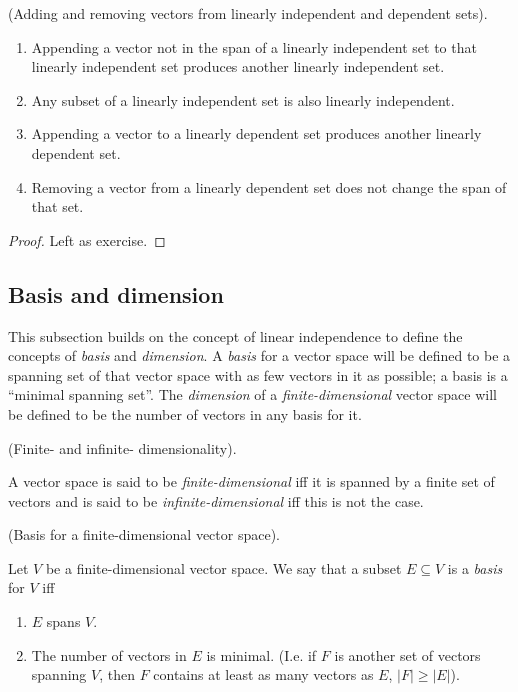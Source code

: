 \begin{lemma}
    \label{ch::lin_alg::lemma::adding_removing_vectors_li_ld_sets}
    (Adding and removing vectors from linearly independent and dependent sets).

    \begin{enumerate}
        \item Appending a vector not in the span of a linearly independent set to that linearly independent set produces another linearly independent set.
        \item Any subset of a linearly independent set is also linearly independent.
        \item Appending a vector to a linearly dependent set produces another linearly dependent set.
        \item Removing a vector from a linearly dependent set does not change the span of that set.
    \end{enumerate}
\end{lemma}

\begin{proof}
   Left as exercise.
\end{proof}


\newpage

\subsection*{Basis and dimension}

This subsection builds on the concept of linear independence to define the concepts of \textit{basis} and \textit{dimension}. A \textit{basis} for a vector space will be defined to be a spanning set of that vector space with as few vectors in it as possible; a basis is a ``minimal spanning set''. The \textit{dimension} of a \textit{finite-dimensional} vector space will be defined to be the number of vectors in any basis for it.

\begin{defn}
    (Finite- and infinite- dimensionality).
    
    A vector space is said to be \textit{finite-dimensional} iff it is spanned by a finite set of vectors and is said to be \textit{infinite-dimensional} iff this is not the case.
\end{defn}

\begin{defn}
    (Basis for a finite-dimensional vector space). 
    
    Let $V$ be a finite-dimensional vector space. We say that a subset $E \subseteq V$ is a \textit{basis} for $V$ iff
    
    \begin{enumerate}
        \item $E$ spans $V$.
        \item The number of vectors in $E$ is minimal. (I.e. if $F$ is another set of vectors spanning $V$, then $F$ contains at least as many vectors as $E$, $|F| \geq |E|$).
    \end{enumerate}
\end{defn}

